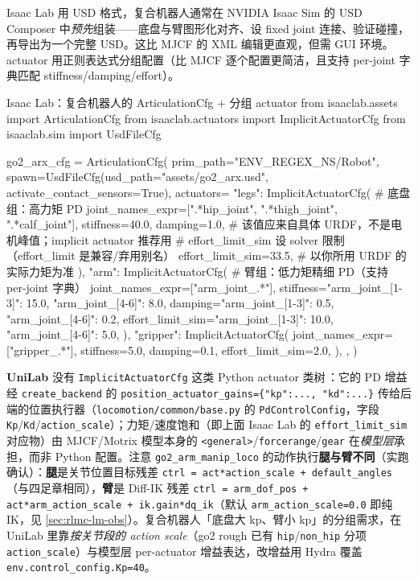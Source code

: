 Isaac Lab 用 USD 格式，复合机器人通常在 NVIDIA Isaac Sim 的 USD Composer 中\emph{预先}组装——底盘与臂图形化对齐、设 fixed joint 连接、验证碰撞，再导出为一个完整 USD。这比 MJCF 的 XML 编辑更直观，但需 GUI 环境。actuator 用正则表达式分组配置（比 MJCF 逐个配置更简洁，且支持 per-joint 字典匹配 stiffness/damping/effort）。

\begin{codebox}[Python]{Isaac Lab：复合机器人的 ArticulationCfg + 分组 actuator}
from isaaclab.assets import ArticulationCfg
from isaaclab.actuators import ImplicitActuatorCfg
from isaaclab.sim import UsdFileCfg

go2_arx_cfg = ArticulationCfg(
    prim_path="{ENV_REGEX_NS}/Robot",
    spawn=UsdFileCfg(usd_path="assets/go2_arx.usd", activate_contact_sensors=True),
    actuators={
        "legs": ImplicitActuatorCfg(        # 底盘组：高力矩 PD
            joint_names_expr=[".*hip_joint", ".*thigh_joint", ".*calf_joint"],
            stiffness=40.0, damping=1.0,
            # 该值应来自具体 URDF，不是电机峰值；implicit actuator 推荐用
            # effort_limit_sim 设 solver 限制（effort_limit 是兼容/弃用别名）
            effort_limit_sim=33.5,          # 以你所用 URDF 的实际力矩为准
        ),
        "arm": ImplicitActuatorCfg(         # 臂组：低力矩精细 PD（支持 per-joint 字典）
            joint_names_expr=["arm_joint_.*"],
            stiffness={"arm_joint_[1-3]": 15.0, "arm_joint_[4-6]": 8.0},
            damping={"arm_joint_[1-3]": 0.5,  "arm_joint_[4-6]": 0.2},
            effort_limit_sim={"arm_joint_[1-3]": 10.0, "arm_joint_[4-6]": 5.0},
        ),
        "gripper": ImplicitActuatorCfg(
            joint_names_expr=["gripper_.*"], stiffness=5.0, damping=0.1,
            effort_limit_sim=2.0,
        ),
    },
)
\end{codebox}

\textbf{UniLab} 没有 \verb|ImplicitActuatorCfg| 这类 Python actuator 类树\,\cite{unilab2026}：它的 PD 增益经 \verb|create_backend| 的 \verb|position_actuator_gains={"kp":..., "kd":...}| 传给后端的位置执行器（\verb|locomotion/common/base.py| 的 \verb|PdControlConfig|，字段 \verb|Kp|/\verb|Kd|/\verb|action_scale|）；力矩/速度饱和（即上面 Isaac Lab 的 \verb|effort_limit_sim| 对应物）由 MJCF/Motrix 模型本身的 \verb|<general>|/\verb|forcerange|/\verb|gear| 在\emph{模型层}承担，而非 Python 配置。注意 \verb|go2_arm_manip_loco| 的动作执行\textbf{腿与臂不同}（实跑确认）：\textbf{腿}是关节位置目标残差 \verb|ctrl = act*action_scale + default_angles|（与四足章相同），\textbf{臂}是 Diff-IK 残差 \verb|ctrl = arm_dof_pos + act*arm_action_scale + ik.gain*dq_ik|（默认 \verb|arm_action_scale=0.0| 即纯 IK，见 \cref{sec:rlmc-lm-obs}）。复合机器人「底盘大 kp、臂小 kp」的分组需求，在 UniLab 里靠\emph{按关节段的 action scale}（go2 rough 已有 \verb|hip|/\verb|non_hip| 分项 \verb|action_scale|）与模型层 per-actuator 增益表达，改增益用 Hydra 覆盖 \verb|env.control_config.Kp=40|。

